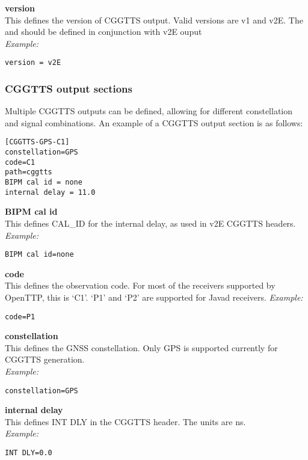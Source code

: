 {\bfseries version}\\
This defines the version of CGGTTS output. Valid versions are v1 and v2E. 
The  and  should be defined in conjunction with v2E ouput\\
\textit{Example:}
\begin{lstlisting}
version = v2E
\end{lstlisting}




\subsubsection{CGGTTS output sections}

Multiple CGGTTS outputs can be defined, allowing for different constellation and signal combinations.
An example of a CGGTTS output section is as follows:
\begin{lstlisting}
[CGGTTS-GPS-C1]
constellation=GPS
code=C1
path=cggtts
BIPM cal id = none
internal delay = 11.0
\end{lstlisting}

{\bfseries BIPM cal id}\\
This defines CAL\_ID for the internal delay, as used in v2E CGGTTS headers.\\
\textit{Example:}
\begin{lstlisting}
BIPM cal id=none
\end{lstlisting}

{\bfseries code}\\
This defines the observation code. For most of the receivers supported by OpenTTP, this is `C1'.
`P1' and `P2' are supported for Javad receivers.
\textit{Example:}
\begin{lstlisting}
code=P1
\end{lstlisting}

{\bfseries constellation}\\
This defines the GNSS constellation. Only GPS is supported currently for CGGTTS generation.\\
\textit{Example:}
\begin{lstlisting}
constellation=GPS
\end{lstlisting}

{\bfseries internal delay}\\
This defines INT DLY in the CGGTTS header. The units are ns.\\
\textit{Example:}
\begin{lstlisting}
INT DLY=0.0
\end{lstlisting}

